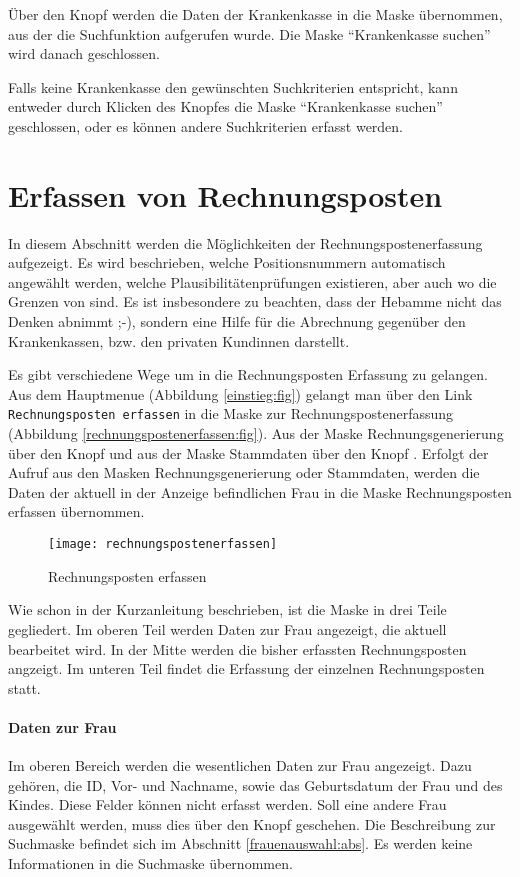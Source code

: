 Über den Knopf  werden die Daten der Krankenkasse in die Maske
übernommen, aus der die Suchfunktion aufgerufen wurde. 
Die Maske ``Krankenkasse suchen''
wird danach geschlossen.

Falls keine Krankenkasse den gewünschten Suchkriterien entspricht, 
kann entweder durch Klicken des Knopfes  die 
Maske ``Krankenkasse suchen''
geschlossen, oder es können andere Suchkriterien erfasst werden.



\section{Erfassen von Rechnungsposten\label{rechnungspostenerfassung:kap}}
In diesem Abschnitt werden die Möglichkeiten der Rechnungspostenerfassung
aufgezeigt. Es wird beschrieben, welche Positionsnummern automatisch
angewählt werden, welche Plausibilitätenprüfungen existieren, 
aber auch wo die Grenzen von \tinyHeb\/ sind. Es
ist insbesondere zu beachten, dass \tinyHeb\/ der Hebamme nicht das
Denken abnimmt ;-), sondern eine Hilfe für die Abrechnung gegenüber den
Krankenkassen, bzw. den privaten Kundinnen darstellt.

Es gibt verschiedene Wege um in die Rechnungsposten Erfassung zu gelangen.
Aus dem Hauptmenue (Abbildung \vref{einstieg:fig})
gelangt man über den Link \verb|Rechnungsposten erfassen|
in die Maske zur Rechnungspostenerfassung (Abbildung 
\vref{rechnungspostenerfassen:fig}). Aus der Maske Rechnungsgenerierung
über den Knopf  und aus der Maske Stammdaten
über den Knopf . Erfolgt der Aufruf
aus den Masken Rechnungsgenerierung oder Stammdaten, werden die Daten
der aktuell in der Anzeige befindlichen Frau in die Maske Rechnungsposten
erfassen übernommen. 

\begin{figure}[ht]
\centering
\texttt{[image: rechnungspostenerfassen]}
\caption{Rechnungsposten erfassen\label{rechnungspostenerfassen:fig}}
\end{figure}

Wie schon in der Kurzanleitung beschrieben, ist
die Maske in drei Teile gegliedert. Im oberen Teil werden Daten zur Frau
angezeigt, die aktuell bearbeitet wird. In der Mitte werden die bisher
erfassten Rechnungsposten angzeigt. Im unteren Teil findet die Erfassung
der einzelnen Rechnungsposten statt.

\paragraph{Daten zur Frau}
Im oberen Bereich werden die wesentlichen Daten zur Frau angezeigt. Dazu
gehören, die ID, Vor- und Nachname, sowie das Geburtsdatum der Frau und
des Kindes. Diese Felder können nicht erfasst werden. Soll eine andere
Frau ausgewählt werden, muss dies über den Knopf  geschehen.
Die Beschreibung zur Suchmaske befindet sich im Abschnitt 
\vref{frauenauswahl:abs}. Es werden keine Informationen in die Suchmaske
übernommen.

